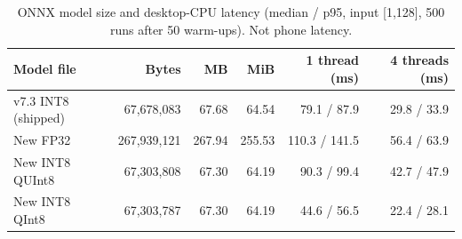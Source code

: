 \begin{table}[t]
\centering
\caption{ONNX model size and desktop-CPU latency (median / p95, input [1,128], 500 runs after 50 warm-ups). Not phone latency.}
\label{tab:deploy}
\small
\begin{tabular}{lrrrrr}
\toprule
Model file & Bytes & MB & MiB & 1 thread (ms) & 4 threads (ms) \\
\midrule
v7.3 INT8 (shipped) & 67,678,083 & 67.68 & 64.54 & 79.1 / 87.9 & 29.8 / 33.9 \\
New FP32 & 267,939,121 & 267.94 & 255.53 & 110.3 / 141.5 & 56.4 / 63.9 \\
New INT8 QUInt8 & 67,303,808 & 67.30 & 64.19 & 90.3 / 99.4 & 42.7 / 47.9 \\
New INT8 QInt8 & 67,303,787 & 67.30 & 64.19 & 44.6 / 56.5 & 22.4 / 28.1 \\
\bottomrule
\end{tabular}
\end{table}
